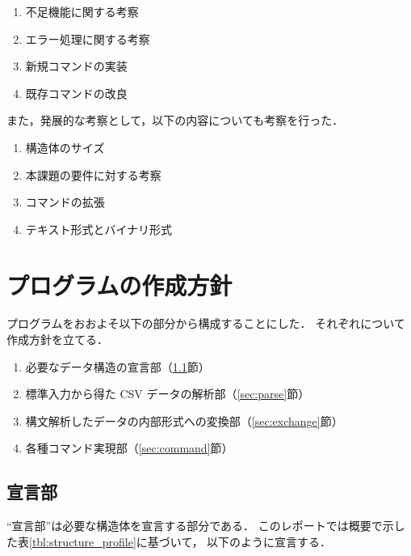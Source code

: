 \documentclass[a4j,11pt]{jarticle}
\begin{document}
\begin{enumerate}
\setlength{\parskip}{2pt}\setlength{\itemsep}{2pt}%
    \item 不足機能に関する考察
    \item エラー処理に関する考察
    \item 新規コマンドの実装
    \item 既存コマンドの改良
\end{enumerate}
また，発展的な考察として，以下の内容についても考察を行った．
\begin{enumerate}
    \setlength{\parskip}{2pt}\setlength{\itemsep}{2pt}%
    \item 構造体のサイズ
    \item 本課題の要件に対する考察
    \item コマンドの拡張
    \item テキスト形式とバイナリ形式
\end{enumerate}

\section{プログラムの作成方針}\label{sec:housin}

プログラムをおおよそ以下の部分から構成することにした．
それぞれについて作成方針を立てる．

\begin{enumerate}
\setlength{\parskip}{2pt} \setlength{\itemsep}{2pt}
    \item 必要なデータ構造の宣言部（\ref{sec:declare}節）
    \item 標準入力から得た CSV データの解析部（\ref{sec:parse}節）
    \item 構文解析したデータの内部形式への変換部（\ref{sec:exchange}節）
    \item 各種コマンド実現部（\ref{sec:command}節）
\end{enumerate}


\subsection{宣言部} 
\label{sec:declare}

``宣言部''は必要な構造体を宣言する部分である．
このレポートでは概要で示した表\ref{tbl:structure_profile}に基づいて，
以下のように宣言する．
\end{document}
